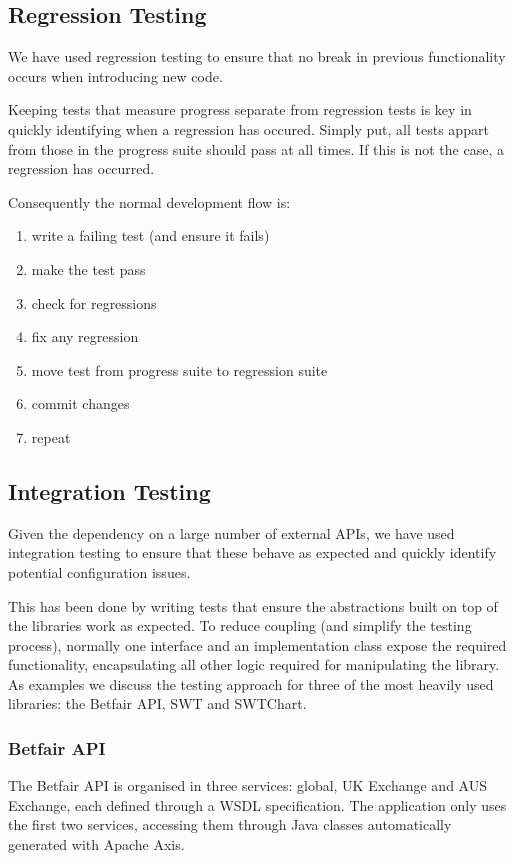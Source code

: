 \documentclass[10pt]{report}
\begin{document}
\subsection{Regression Testing}
We have used regression testing to ensure that no break in previous functionality occurs when introducing new code.

Keeping tests that measure progress separate from regression tests is key in quickly identifying when a regression has occured. Simply put, all tests appart from those in the progress suite should pass at all times. If this is not the case, a regression has occurred.

Consequently the normal development flow is: 
\begin{enumerate}
\item write a failing test (and ensure it fails)
\item make the test pass
\item check for regressions
\item fix any regression
\item move test from progress suite to regression suite
\item commit changes
\item repeat
\end{enumerate}

\subsection{Integration Testing}

Given the dependency on a large number of external APIs, we have used integration testing to ensure that these behave as expected and quickly identify potential configuration issues. 

This has been done by writing tests that ensure the abstractions built on top of the libraries work as expected. To reduce coupling (and simplify the testing process), normally one interface and an implementation class expose the required functionality, encapsulating all other logic required for manipulating the library. As examples we discuss the testing approach for three of the most heavily used libraries: the Betfair API, SWT and SWTChart.

\subsubsection{Betfair API}

The Betfair API is organised in three services: global, UK Exchange and AUS Exchange, each defined through a WSDL specification. The application only uses the first two services, accessing them through Java classes automatically generated with Apache Axis.
\end{document}
